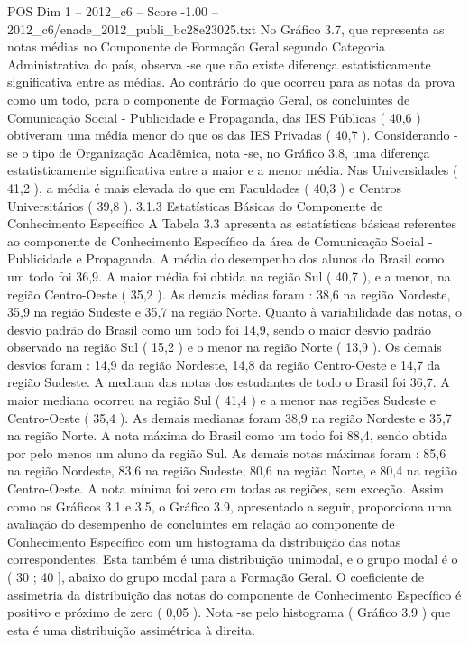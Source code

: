 \begin{textsample}{POS Dim 1 – 2012\_c6 – Score -1.00 – 2012\_c6/enade\_2012\_publi\_bc28e23025.txt}
No Gráfico 3.7, que representa as notas médias no Componente de Formação Geral segundo Categoria Administrativa do país, observa -se que não existe diferença estatisticamente significativa entre as médias.
Ao contrário do que ocorreu para as notas da prova como um todo, para o componente de Formação Geral, os concluintes de Comunicação Social - Publicidade e Propaganda, das IES Públicas ( 40,6 ) obtiveram uma média menor do que os das IES Privadas ( 40,7 ).
Considerando -se o tipo de Organização Acadêmica, nota -se, no Gráfico 3.8, uma diferença estatisticamente significativa entre a maior e a menor média.
Nas Universidades ( 41,2 ), a média é mais elevada do que em Faculdades ( 40,3 ) e Centros Universitários ( 39,8 ). 3.1.3 Estatísticas Básicas do Componente de Conhecimento Específico A Tabela 3.3 apresenta as estatísticas básicas referentes ao componente de Conhecimento Específico da área de Comunicação Social - Publicidade e Propaganda.
A média do desempenho dos alunos do Brasil como um todo foi 36,9.
A maior média foi obtida na região Sul ( 40,7 ), e a menor, na região Centro-Oeste ( 35,2 ).
As demais médias foram : 38,6 na região Nordeste, 35,9 na região Sudeste e 35,7 na região Norte.
Quanto à variabilidade das notas, o desvio padrão do Brasil como um todo foi 14,9, sendo o maior desvio padrão observado na região Sul ( 15,2 ) e o menor na região Norte ( 13,9 ).
Os demais desvios foram : 14,9 da região Nordeste, 14,8 da região Centro-Oeste e 14,7 da região Sudeste.
A mediana das notas dos estudantes de todo o Brasil foi 36,7.
A maior mediana ocorreu na região Sul ( 41,4 ) e a menor nas regiões Sudeste e Centro-Oeste ( 35,4 ).
As demais medianas foram 38,9 na região Nordeste e 35,7 na região Norte.
A nota máxima do Brasil como um todo foi 88,4, sendo obtida por pelo menos um aluno da região Sul.
As demais notas máximas foram : 85,6 na região Nordeste, 83,6 na região Sudeste, 80,6 na região Norte, e 80,4 na região Centro-Oeste.
A nota mínima foi zero em todas as regiões, sem exceção.
Assim como os Gráficos 3.1 e 3.5, o Gráfico 3.9, apresentado a seguir, proporciona uma avaliação do desempenho de concluintes em relação ao componente de Conhecimento Específico com um histograma da distribuição das notas correspondentes.
Esta também é uma distribuição unimodal, e o grupo modal é o ( 30 ; 40 ], abaixo do grupo modal para a Formação Geral.
O coeficiente de assimetria da distribuição das notas do componente de Conhecimento Específico é positivo e próximo de zero ( 0,05 ).
Nota -se pelo histograma ( Gráfico 3.9 ) que esta é uma distribuição assimétrica à direita.

\end{textsample}
